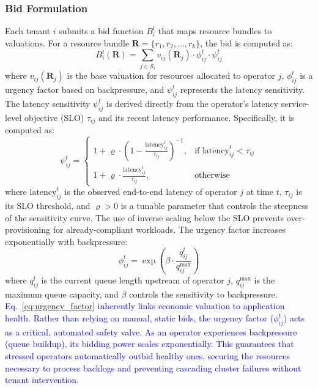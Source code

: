 \documentclass[lettersize,journal]{IEEEtran}
\begin{document}
\subsubsection{Bid Formulation}
\label{ssub:bid_formulation}
Each tenant $i$ submits a bid function $B_i^t$ that maps resource bundles to valuations. For a resource bundle $\mathbf{R} = \{r_1, r_2, ..., r_k\}$, the bid is computed as:
\begin{equation}
\label{eq:bid_function}
B_i^t(\mathbf{R}) = \sum_{j \in \mathcal{S}_i} v_{ij}(\mathbf{R}_j) \cdot \phi_{ij}^t \cdot \psi_{ij}^t
\end{equation}
where $v_{ij}(\mathbf{R}_j)$ is the base valuation for resources allocated to operator $j$, $\phi_{ij}^t$ is a urgency factor based on backpressure, and $\psi_{ij}^t$ represents the latency sensitivity.
The latency sensitivity $\psi_{ij}^t$ is derived directly from the operator’s latency service-level objective (SLO) $\tau_{ij}$ and its recent latency performance. Specifically, it is computed as:
\begin{equation}
\label{eq:latency_sensitivity}
\psi_{ij}^t = 
\begin{cases}
1 + \varrho  \cdot \left(1 - \frac{\text{latency}_{ij}^t}{\tau_{ij}}\right)^{-1}, & \text{if } \text{latency}_{ij}^t < \tau_{ij} \\
1 + \varrho  \cdot \frac{\text{latency}_{ij}^t}{\tau_{ij}}, & \text{otherwise}
\end{cases}
\end{equation}
where $\text{latency}_{ij}^t$ is the observed end-to-end latency of operator $j$ at time $t$, $\tau_{ij}$ is its SLO threshold, and $\varrho  > 0$ is a tunable parameter that controls the steepness of the sensitivity curve. The use of inverse scaling below the SLO prevents over-provisioning for already-compliant workloads.
The urgency factor increases exponentially with backpressure:
\begin{equation}\label{eq:urgency_factor}
\phi_{ij}^t = \exp\left(\beta \cdot \frac{q_{ij}^t}{q_{ij}^{\max}}\right)
\end{equation}
where $q_{ij}^t$ is the current queue length upstream of operator $j$, $q_{ij}^{\max}$ is the maximum queue capacity, and $\beta$ controls the sensitivity to backpressure.
\textcolor{blue}{Eq.~\ref{eq:urgency_factor} inherently links economic valuation to application health. Rather than relying on manual, static bids, the urgency factor ($\phi_{ij}^t$) acts as a critical, automated safety valve. As an operator experiences backpressure (queue buildup), its bidding power scales exponentially.}
\textcolor{blue}{This guarantees that stressed operators automatically outbid healthy ones, securing the resources necessary to process backlogs and preventing cascading cluster failures without tenant intervention.}
\end{document}
